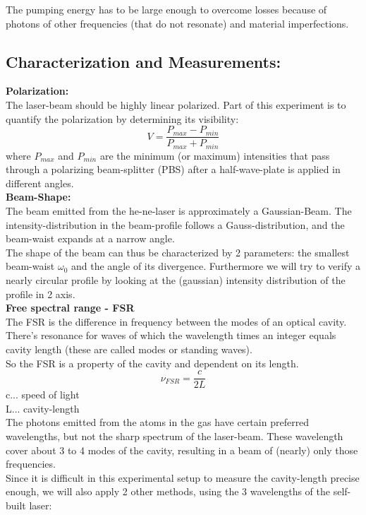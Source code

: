 \documentclass[12pt,a4paper]{article}
\begin{document}
\begin{multicols}{2}
\noindent The pumping energy has to be large enough to overcome losses because of photons of other frequencies (that do not resonate) and material imperfections.\\

\subsection{Characterization and Measurements:}

\textbf{Polarization:}\\
The laser-beam should be highly linear polarized. Part of this experiment is to quantify the polarization by determining its visibility:
$$V = \frac{P_{max}-P_{min}}{P_{max}+P_{min}}$$
where $P_{max}$ and $P_{min}$ are the minimum (or maximum) intensities that pass through a polarizing beam-splitter (PBS) after a half-wave-plate is applied in different angles.\\

\noindent \textbf{Beam-Shape:}\\
The beam emitted from the he-ne-laser is approximately a Gaussian-Beam. The intensity-distribution in the beam-profile follows a Gauss-distribution, and the beam-waist expands at a narrow angle.\\
The shape of the beam can thus be characterized by 2 parameters: the smallest beam-waist $\omega_0$ and the angle of its divergence. Furthermore we will try to verify a nearly circular profile by looking at the (gaussian) intensity distribution of the profile in 2 axis.\\

\noindent \textbf{Free spectral range - FSR}\\
The FSR is the difference in frequency between the modes of an optical cavity. There's resonance for waves of which the wavelength times an integer equals cavity length (these are called modes or standing waves).\\
So the FSR is a property of the cavity and dependent on its length.
$$\nu_{FSR} = \frac{c}{2L}$$
c... speed of light \\
L... cavity-length\\


\noindent The photons emitted from the atoms in the gas have certain preferred wavelengths, but not the sharp spectrum of the laser-beam. These wavelength cover about 3 to 4 modes of the cavity, resulting in a beam of (nearly) only those frequencies.\\
Since it is difficult in this experimental setup to measure the cavity-length precise enough, we will also apply 2 other methods, using the 3 wavelengths of the self-built laser:\\


\end{multicols}
\end{document}
